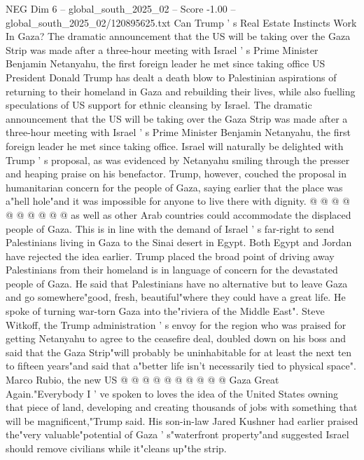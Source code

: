 \begin{textsample}{NEG Dim 6 – global\_south\_2025\_02 – Score -1.00 – global\_south\_2025\_02/120895625.txt}  \label{ex:f6_neg_037}
Can Trump ' s Real Estate Instincts Work In Gaza?
The dramatic announcement that the US will be taking over the Gaza Strip was made after a three-hour meeting with Israel ' s Prime Minister Benjamin Netanyahu, the first foreign leader he met since taking office US President Donald Trump has dealt a death blow to Palestinian aspirations of returning to their homeland in Gaza and rebuilding their lives, while also fuelling speculations of US support for ethnic cleansing by Israel.
The dramatic announcement that the US will be taking over the Gaza Strip was made after a three-hour meeting with Israel ' s Prime Minister Benjamin Netanyahu, the first foreign leader he met since taking office.
Israel will naturally be delighted with Trump ' s proposal, as was evidenced by Netanyahu smiling through the presser and heaping praise on his benefactor.
Trump, however, couched the proposal in humanitarian concern for the people of Gaza, saying earlier that the place was a"hell hole"and it was impossible for anyone to live there with dignity. @ @ @ @ @ @ @ @ @ @ as well as other Arab countries could accommodate the displaced people of Gaza.
This is in line with the demand of Israel ' s far-right to send Palestinians living in Gaza to the Sinai desert in Egypt.
Both Egypt and Jordan have rejected the idea earlier.
Trump placed the broad point of driving away Palestinians from their homeland is in language of concern for the devastated people of Gaza.
He said that Palestinians have no alternative but to leave Gaza and go somewhere"good, fresh, beautiful"where they could have a great life.
He spoke of turning war-torn Gaza into the"riviera of the Middle East".
Steve Witkoff, the Trump administration ' s envoy for the region who was praised for getting Netanyahu to agree to the ceasefire deal, doubled down on his boss and said that the Gaza Strip"will probably be uninhabitable for at least the next ten to fifteen years"and said that a"better life isn't necessarily tied to physical space".
Marco Rubio, the new US @ @ @ @ @ @ @ @ @ @ Gaza Great Again."Everybody I ' ve spoken to loves the idea of the United States owning that piece of land, developing and creating thousands of jobs with something that will be magnificent,"Trump said.
His son-in-law Jared Kushner had earlier praised the"very valuable"potential of Gaza ' s"waterfront property"and suggested Israel should remove civilians while it"cleans up"the strip.

\end{textsample}
